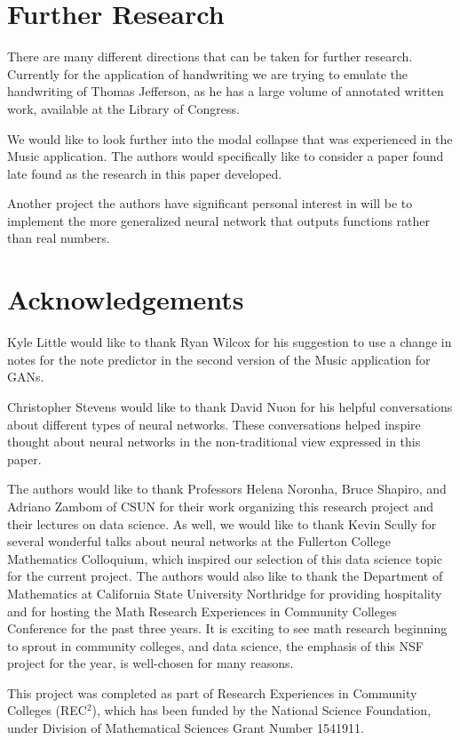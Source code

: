 \documentclass[12pt]{amsart}
\theoremstyle{definition}
\theoremstyle{remark}
\begin{document}
\section{Further Research}
There are many different directions that can be taken for further research.
Currently for the application of handwriting we are trying to emulate the handwriting
of Thomas Jefferson, as he has a large volume of annotated written work, available at
the Library of Congress.

We would like to look further into the modal collapse that was experienced in the Music application. 
The authors would specifically like to consider a paper found late found as the  research in this paper developed.\cite{1809.09087}

Another project the authors have significant personal interest in will be to
implement the more generalized neural network that outputs functions rather than
real numbers.

\section{Acknowledgements}
Kyle Little would like to thank Ryan Wilcox for his suggestion to use a change in notes for the note predictor in the second version of the Music application for GANs.

Christopher Stevens would like to thank David Nuon for his helpful conversations
about different types of neural networks.  These conversations helped inspire thought about 
neural networks in the non-traditional view expressed in this paper.


The authors would like to thank Professors Helena Noronha, Bruce Shapiro, and Adriano Zambom of CSUN for their
work organizing this research project and their lectures on data science. As well, we would like
to thank Kevin Scully for several wonderful talks about neural networks at the Fullerton College Mathematics
Colloquium, which inspired our selection of this data science topic for the current project.  The authors would also like to thank the Department of Mathematics at California State University Northridge for providing hospitality and for hosting the Math Research Experiences in Community Colleges Conference for the past three years.  It is exciting to see math research beginning to sprout in community colleges, and data science, the emphasis of this NSF project for the year, is well-chosen for many reasons.

This project was completed as part of Research Experiences in Community Colleges (REC$^2$), which has been funded by the National Science Foundation, under Division of Mathematical Sciences Grant Number 1541911.

\newpage

\printbibliography
\end{document}
